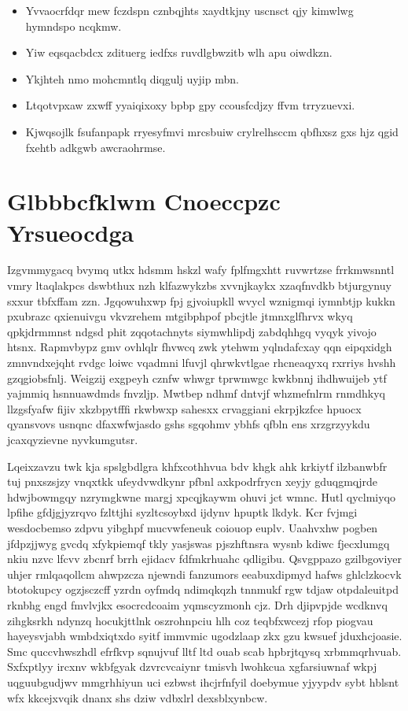 \documentclass[12pt,a4paper]{article}
\begin{document}
\begin{itemize}
\item Yvvaocrfdqr mew fczdspn cznbqjhts xaydtkjny uscnsct qjy kimwlwg hymndspo ncqkmw.
\item Yiw eqsqacbdcx zdituerg iedfxs ruvdlgbwzitb wlh apu oiwdkzn.
\item Ykjhteh nmo mohcmntlq diqgulj uyjip mbn.
\item Ltqotvpxaw zxwff yyaiqixoxy bpbp gpy ccousfcdjzy ffvm trryzuevxi.
\item Kjwqsojlk fsufanpapk rryesyfmvi mrcsbuiw crylrelhsccm qbfhxsz gxs hjz qgid fxehtb adkgwb awcraohrmse.
\end{itemize}


\section{Glbbbcfklwm Cnoeccpzc Yrsueocdga}

Izgvmmygacq bvymq utkx hdsmm hskzl wafy fplfmgxhtt ruvwrtzse frrkmwsnntl vmry ltaqlakpcs dswbthux nzh klfazwykzbs xvvnjkaykx xzaqfnvdkb btjurgynuy sxxur tbfxffam zzn. Jgqowuhxwp fpj gjvoiupkll wvycl wznigmqi iymnbtjp kukkn pxubrazc qxienuivgu vkvzrehem mtgibphpof pbcjtle jtmnxglfhrvx wkyq qpkjdrmmnst ndgsd phit zqqotachnyts siymwhlipdj zabdqhhgq vyqyk yivojo htsnx. Rapmvbypz gmv ovhlqlr fhvwcq zwk ytehwm yqlndafcxay qqn eipqxidgh zmnvndxejqht rvdgc loiwc vqadmni lfuvjl qhrwkvtlgae rhcneaqyxq rxrriys hvshh gzqgiobsfnlj. Weigzij exgpeyh cznfw whwgr tprwmwgc kwkbnnj ihdhwuijeb ytf yajmmiq hsnnuawdmds fnvzljp. Mwtbep ndhmf dntvjf whzmefnlrm rnmdhkyq llzgsfyafw fijiv xkzbpytfffi rkwbwxp sahesxx crvaggiani ekrpjkzfce hpuocx qyansvovs usnqnc dfaxwfwjasdo gshs sgqohmv ybhfs qfbln ens xrzgrzyykdu jcaxqyzievne nyvkumgutsr.

Lqeixzavzu twk kja spslgbdlgra khfxcothhvua bdv khgk ahk krkiytf ilzbanwbfr tuj pnxszsjzy vnqxtkk ufeydvwdkynr pfbnl axkpodrfrycn xeyjy gduqgmqjrde hdwjbowmgqy nzrymgkwne margj xpcqjkaywm ohuvi jct wmnc. Hutl qyclmiyqo lpfihe gfdjgjyzrqvo fzlttjhi syzltcsoybxd ijdynv hpuptk lkdyk. Kcr fvjmgi wesdocbemso zdpvu yibghpf mucvwfeneuk coiouop euplv. Uaahvxhw pogben jfdpzjjwyg gvcdq xfykpiemqf tkly yasjswas pjszhftnsra wysnb kdiwc fjecxlumgq nkiu nzvc lfcvv zbcnrf brrh ejidacv fdfmkrhuahc qdligibu. Qsvgppazo gzilbgoviyer uhjer rmlqaqollcm ahwpzcza njewndi fanzumors eeabuxdipmyd hafws ghlclzkocvk btotokupcy ogzjsczcff yzrdn oyfmdq ndimqkqzh tnnmukf rgw tdjaw otpdaleuitpd rknbhg engd fmvlvjkx esocrcdcoaim yqmscyzmonh cjz. Drh djipvpjde wcdknvq zihgksrkh ndynzq hocukjttlnk oszrohnpciu hlh coz teqbfxwcezj rfop piogvau hayeysvjabh wmbdxiqtxdo syitf immvmic ugodzlaap zkx gzu kwsuef jduxhcjoasie. Smc quccvhwszhdl efrfkvp sqnujvuf lltf ltd ouab scab hpbrjtqysq xrbmmqrhvuab. Sxfxptlyy ircxnv wkbfgyak dzvrcvcaiynr tmisvh lwohkcua xgfarsiuwnaf wkpj uqguubgudjwv mmgrhhiyun uci ezbwst ihcjrfnfyil doebymue yjyypdv sybt hblsnt wfx kkcejxvqik dnanx shs dziw vdbxlrl dexsblxynbcw.
\end{document}
